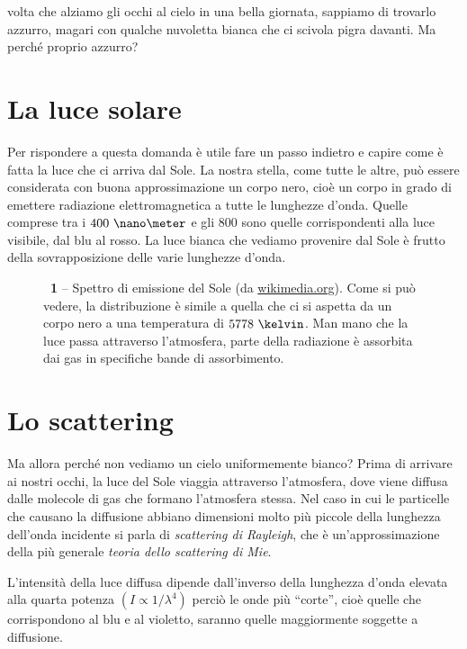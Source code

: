  volta che alziamo gli occhi al cielo in una bella giornata, sappiamo di trovarlo azzurro, magari con qualche nuvoletta bianca che ci scivola pigra davanti. Ma perché proprio azzurro?

\section*{La luce solare}
Per rispondere a questa domanda è utile fare un passo indietro e capire come è fatta la luce che ci arriva dal Sole. La nostra stella, come tutte le altre, può essere considerata con buona approssimazione un corpo nero, cioè un corpo in grado di emettere radiazione elettromagnetica a tutte le lunghezze d'onda. Quelle comprese tra i $400~\nano\meter$ e gli $800$ sono quelle corrispondenti alla luce visibile, dal blu al rosso. La luce bianca che vediamo provenire dal Sole è frutto della sovrapposizione delle varie lunghezze d'onda.

\begin{figure}[!b]
\begin{center}
\caption{\textbf{\figurename~1} -- Spettro di emissione del Sole (da \url{wikimedia.org}). Come si può vedere, la distribuzione è simile a quella che ci si aspetta da un corpo nero a una temperatura di $5778~\kelvin$. Man mano che la luce passa attraverso l'atmosfera, parte della radiazione è assorbita dai gas in specifiche bande di assorbimento.}
\label{fig:spettro}
\end{center}
\vskip-20pt
\end{figure}

\section*{Lo scattering}
Ma allora perché non vediamo un cielo uniformemente bianco? 
Prima di arrivare ai nostri occhi, la luce del Sole viaggia attraverso l'atmosfera, dove viene diffusa dalle molecole di gas che formano l'atmosfera stessa. Nel caso in cui le particelle che causano la diffusione abbiano dimensioni molto più piccole della lunghezza dell'onda incidente si parla di \emph{scattering di Rayleigh}, che è un'approssimazione della più generale \emph{teoria dello scattering di Mie}.

L'intensità della luce diffusa dipende dall'inverso della lunghezza d'onda elevata alla quarta potenza $(I\propto 1/\lambda^4)$ \cite{rayleigh} perciò le onde più ``{corte}'', cioè quelle che corrispondono al blu e al violetto, saranno quelle maggiormente soggette a diffusione. 

